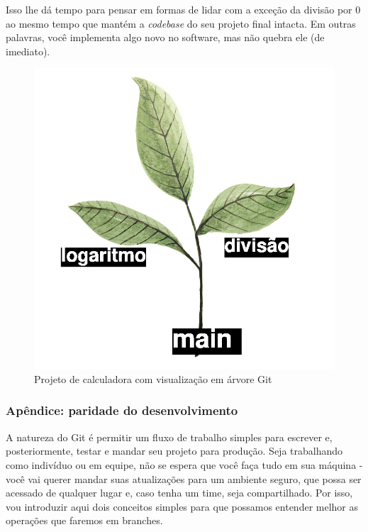 \documentclass{article}
\begin{document}
	Isso lhe dá tempo para pensar em formas de lidar com a exceção da divisão por 0 ao mesmo tempo que mantém a \textit{codebase}
	do seu projeto final intacta. Em outras palavras, você implementa algo novo no software, mas não quebra ele (de imediato).

	\begin{figure}[ht!]
		\centering
	  	\includegraphics[scale=0.3]{figs/software_tree.png} 
		\caption*{Projeto de calculadora com visualização em árvore Git}
  \end{figure}

  \subsubsection{Apêndice: paridade do desenvolvimento}

  A natureza do Git é permitir um fluxo de trabalho simples para escrever e, posteriormente, testar e mandar seu projeto para
  produção. Seja trabalhando como indivíduo ou em equipe, não se espera que você faça tudo em sua máquina - você vai querer
  mandar suas atualizações para um ambiente seguro, que possa ser acessado de qualquer lugar e, caso tenha um time, seja 
  compartilhado. Por isso, vou introduzir aqui dois conceitos simples para que possamos entender melhor as operações que 
  faremos em branches. 
\end{document}
